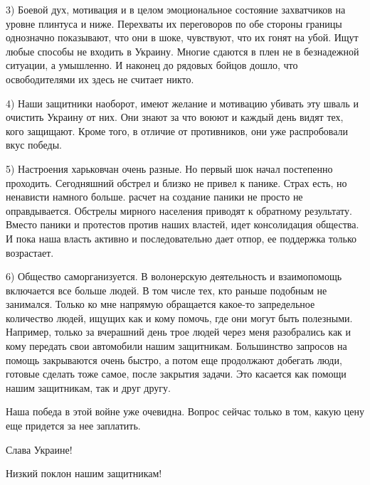3) Боевой дух, мотивация и в целом эмоциональное состояние захватчиков на
уровне плинтуса и ниже. Перехваты их переговоров по обе стороны границы
однозначно показывают, что они в шоке, чувствуют, что их гонят на убой. Ищут
любые способы не входить в Украину. Многие сдаются в плен не в безнадежной
ситуации, а умышленно. И наконец до рядовых бойцов дошло, что освободителями их
здесь не считает никто.

4) Наши защитники наоборот, имеют желание и мотивацию убивать эту шваль и
очистить Украину от них. Они знают за что воюют и каждый день видят тех, кого
защищают. Кроме того, в отличие от противников, они уже распробовали вкус
победы.

5) Настроения харьковчан очень разные. Но первый шок начал постепенно
проходить. Сегодняшний обстрел и близко не привел к панике. Страх есть, но
ненависти намного больше. расчет на создание паники не просто не оправдывается.
Обстрелы мирного населения приводят к обратному результату. Вместо паники и
протестов против наших властей, идет консолидация общества. И пока наша власть
активно и последовательно дает отпор, ее поддержка только возрастает.

6) Общество саморганизуется. В волонерскую деятельность и взаимопомощь
включается все больше людей. В том числе тех, кто раньше подобным не занимался.
Только ко мне напрямую обращается какое-то запредельное количество людей,
ищущих как и кому помочь, где они могут быть полезными. Например, только за
вчерашний день трое людей через меня разобрались как и кому передать свои
автомобили нашим защитникам. Большинство запросов на помощь закрываются очень
быстро, а потом еще продолжают добегать люди, готовые сделать тоже самое, после
закрытия задачи. Это касается как помощи нашим защитникам, так и друг другу. 

Наша победа в этой войне уже очевидна. Вопрос сейчас только в том, какую цену
еще придется за нее заплатить.

Слава Украине! 

Низкий поклон нашим защитникам!
